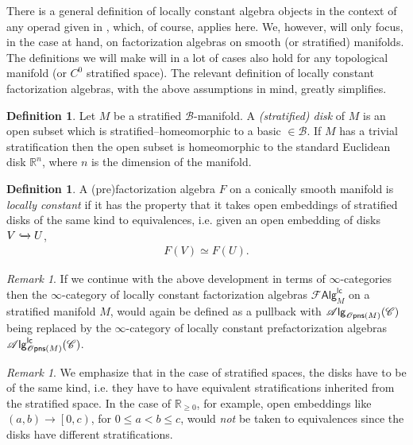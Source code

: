 \documentclass[12pt,a4paper]{article}
\newcounter{counter} \numberwithin{counter}{section}
\theoremstyle{definition}
\newtheorem{definition}[counter]{Definition}
\theoremstyle{plain}
\theoremstyle{remark}
\newtheorem{remark}[counter]{Remark}
\newcommand{\catC}{\mathscr{C}}
\newcommand{\lcfa}{\mathscr{F} \mathsf{Alg}^{\mathsf{lc}}}
\newcommand{\opens}[1][s]{%
    \ifx r#1\mathsf{Opns}\else
    \ifx s#1\mathscr{O} \mathsf{pns}\else
    \mathrm{Illegal~option}%
    \fi\fi
}
\newcommand{\alg}[1]{\mathscr{A} \mathsf{lg}_{#1}}
\newcommand{\lcalg}[1]{\mathscr{A} \mathsf{lg}^{\mathsf{lc}}_{#1}}
\newcommand{\hoint}{\mathbb{R}_{\geq 0}}
\newcommand{\bstr}{\mathscr{B}}
\begin{document}
There is a general definition of locally constant algebra objects in the context of any operad given in \cite[def.2.3.3.20]{lurie_ha}, which, of course, applies here. We, however, will only focus, in the case at hand, on factorization algebras on smooth (or stratified) manifolds. The definitions we will make will in a lot of cases also hold for any topological manifold (or $C^0$ stratified space). The relevant definition of locally constant factorization algebras, with the above assumptions in mind, greatly simplifies.

\begin{definition}
    Let $M$ be a stratified $\bstr$-manifold. A \emph{(stratified) disk} of $M$ is an open subset which is stratified--homeomorphic to a basic $\in \bstr$. If $M$ has a trivial stratification then the open subset is homeomorphic to the standard Euclidean disk $\mathbb{R}^n$, where $n$ is the dimension of the manifold.
\end{definition}

\begin{definition}\label{def:lcfa}
    A (pre)factorization algebra $F$ on a conically smooth manifold is \emph{locally constant} if it has the property that it takes open embeddings of stratified disks of the same kind to equivalences, i.e. given an open embedding of disks $V \xhookrightarrow{} U$,
    \begin{align}
        F(V) \simeq F(U).
    \end{align}
\end{definition}

\begin{remark}
    If we continue with the above development in terms of $\infty$-categories then the $\infty$-category of locally constant factorization algebras $\lcfa_M$ on a stratified manifold $M$, would again be defined as a pullback with $\alg{\opens[s](M)}(\catC)$ being replaced by the $\infty$-category of locally constant prefactorization algebras $\lcalg{\opens[s](M)}(\catC)$.
\end{remark}

\begin{remark}
    We emphasize that in the case of stratified spaces, the disks have to be of the same kind, i.e. they have to have equivalent stratifications inherited from the stratified space. In the case of $\hoint$, for example, open embeddings like $(a, b) \rightarrow \left[0, c\right)$, for $0 \leq a < b \leq c$, would \emph{not} be taken to equivalences since the disks have different stratifications.
\end{remark}
\end{document}
